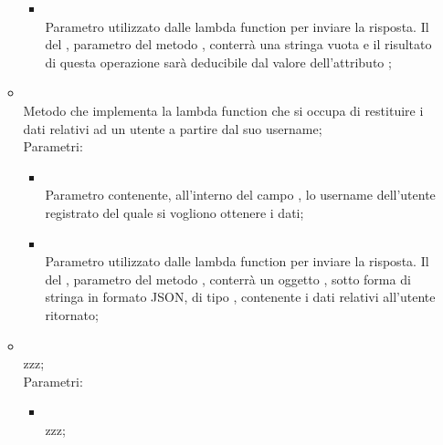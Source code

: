 \begin{itemize}
\begin{itemize}
\begin{itemize}
			\item {} \\
			Parametro utilizzato dalle lambda function per inviare la risposta. Il  del , parametro del metodo , conterrà una stringa vuota e il risultato di questa operazione sarà deducibile dal valore dell'attributo ;
		\end{itemize}
		\item[]  \\
		Metodo che implementa la lambda function che si occupa di restituire i dati relativi ad un utente a partire dal suo username;\\
		Parametri:
		\begin{itemize}
			\item {} \\
			Parametro contenente, all'interno del campo , lo username dell'utente registrato del quale si vogliono ottenere i dati;
			\item {} \\
			Parametro utilizzato dalle lambda function per inviare la risposta. Il  del , parametro del metodo , conterrà un oggetto , sotto forma di stringa in formato JSON, di tipo , contenente i dati relativi all'utente ritornato;
		\end{itemize}
		\item[]  \\
		zzz;\\
		Parametri:
		\begin{itemize}
			\item {} \\
			zzz;
		\end{itemize}
	\end{itemize}
\end{itemize}

